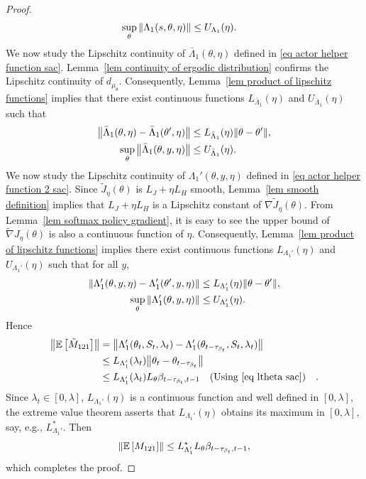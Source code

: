 \documentclass[twoside,11pt]{article}
\newcommand{\E}{\mathbb{E}}
\numberwithin{assucounter}{section}
\begin{document}
\begin{proof}
\begin{align}
    \sup_{\theta} \norm{\Lambda_1(s, \theta, \eta)} &\leq U_{\Lambda_1}(\eta).
  \end{align}
  We now study the Lipschitz continuity of $\bar \Lambda_1(\theta, \eta)$ defined in \eqref{eq actor helper function sac}.
  Lemma~\ref{lem continuity of ergodic distribution} confirms the Lipschitz continuity of $d_{\mu_\theta}$.
  Consequently,
  Lemma~\ref{lem product of lipschitz functions} implies that 
  there exist continuous functions $L_{\bar \Lambda_1}(\eta)$ and $U_{\bar \Lambda_1}(\eta)$ such that
  \begin{align}
    \norm{\bar \Lambda_1(\theta, \eta) - \bar \Lambda_1(\theta', \eta)} &\leq L_{\bar \Lambda_1}(\eta) \norm{\theta -\theta'}, \\
    \sup_{\theta} \norm{\bar \Lambda_1(\theta, y, \eta)} &\leq U_{\bar \Lambda_1}(\eta).
  \end{align}
  We now study the Lipschitz continuity of $\Lambda_1'(\theta, y, \eta)$ defined in \eqref{eq actor helper function 2 sac}.
  Since $\tilde J_\eta(\theta)$ is $L_J + \eta L_H$ smooth,
  Lemma~\ref{lem smooth definition} implies that
  $L_J + \eta L_H$ is a Lipschitz constant of $\nabla \tilde J_\eta(\theta)$.
  From Lemma~\ref{lem softmax policy gradient},
  it is easy to see the upper bound of $\tilde \nabla J_\eta(\theta)$ is also a continuous function of $\eta$.
  Consequently,
  Lemma~\ref{lem product of lipschitz functions} implies
  there exist continuous functions $L_{\Lambda_1'}(\eta)$ and $U_{\Lambda_1'}(\eta)$ such that
  for all $y$,
  \begin{align}
    \norm{\Lambda_1'(\theta, y, \eta) - \Lambda_1'(\theta', y, \eta)} &\leq L_{\Lambda_1'}(\eta) \norm{\theta -\theta'}, \\
    \sup_\theta \norm{\Lambda_1'(\theta, y, \eta)} &\leq U_{\Lambda_1'}(\eta).
  \end{align}
  Hence
  \begin{align}
    \norm{\E\left[\tilde M_{121}\right]} &= \norm{\Lambda_1'(\theta_t, S_t, \lambda_t) - \Lambda_1'(\theta_{t-\tau_{\beta_t}}, S_t, \lambda_t)} \\
    &\leq L_{\Lambda_1'}(\lambda_t) \norm{\theta_t - \theta_{t-\tau_{\beta_t}}} \\
    &\leq L_{\Lambda_1'}(\lambda_t) L_\theta \beta_{t-\tau_{\beta_t}, t-1} \qq{(Using \eqref{eq ltheta sac})}.
  \end{align}
  Since $\lambda_t \in [0, \lambda]$, 
  $L_{\Lambda_1'}(\eta)$ is a continuous function and well defined in $[0, \lambda]$,
  the extreme value theorem asserts that $L_{\Lambda_1'}(\eta)$ obtains its maximum in $[0, \lambda]$,
  say, e.g., $L_{\Lambda_1'}^*$.
  Then 
  \begin{align}
    \norm{\E\left[M_{121}\right]} \leq L_{\Lambda_1'}^* L_\theta \beta_{t-\tau_{\beta_t}, t-1},
  \end{align}
  which completes the proof.
\end{proof}
\end{document}
